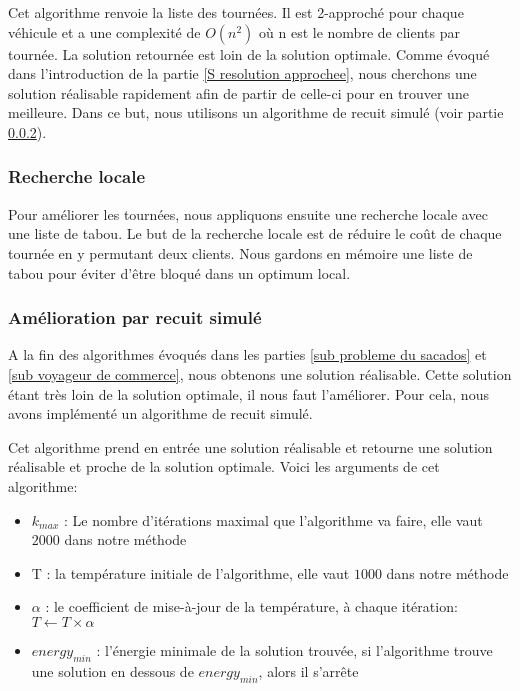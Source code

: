 Cet algorithme renvoie la liste des tournées. Il est 2-approché pour chaque véhicule et a une complexité de $O(n^2)$ où n est le nombre de clients par tournée. La solution retournée est loin de la solution optimale. Comme évoqué dans l'introduction de la partie \ref{S resolution approchee}, nous cherchons une solution réalisable rapidement afin de partir de celle-ci pour en trouver une meilleure. Dans ce but, nous utilisons un algorithme de recuit simulé (voir partie \ref{sub recuit simule}).

\subsubsection{Recherche locale}
\label{sub recherche locale}
Pour améliorer les tournées, nous appliquons ensuite une recherche locale avec une liste de tabou. Le but de la recherche locale est de réduire le coût de chaque tournée en y permutant deux clients. Nous gardons en mémoire une liste de tabou pour éviter d'être bloqué dans un optimum local.


\subsubsection{Amélioration par recuit simulé}
\label{sub recuit simule}
A la fin des algorithmes évoqués dans les parties \ref{sub probleme du sacados} et \ref{sub voyageur de commerce}, nous obtenons une solution réalisable. Cette solution étant très loin de la solution optimale, il nous faut l'améliorer. Pour cela, nous avons implémenté un algorithme de recuit simulé.

Cet algorithme prend en entrée une solution réalisable et retourne une solution réalisable et proche de la solution optimale. Voici les arguments de cet algorithme:

\begin{itemize}
    \item $k_{max}$ : Le nombre d'itérations maximal que l'algorithme va faire, elle vaut $2000$ dans notre méthode
    \item T : la température initiale de l'algorithme, elle vaut $1000$ dans notre méthode
    \item $\alpha$ : le coefficient de mise-à-jour de la température, à chaque itération: $T \gets T \times \alpha$
    \item $energy_{min}$ : l'énergie minimale de la solution trouvée, si l'algorithme trouve une solution en dessous de $energy_{min}$, alors il s'arrête
\end{itemize}\\

